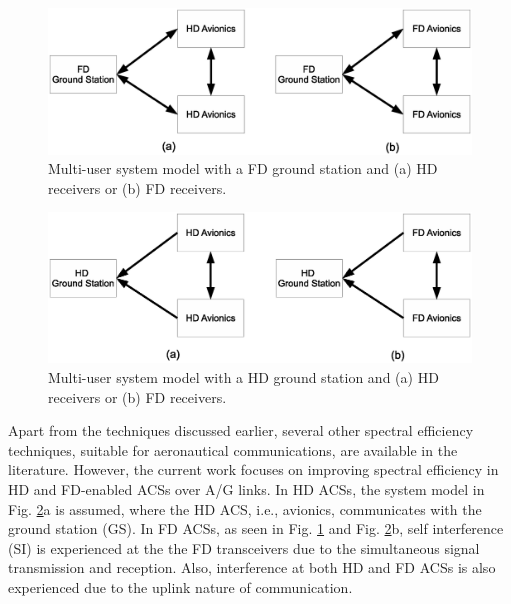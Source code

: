 \begin{figure}[]
\centering
\vspace{-2cm}
\includegraphics [width=0.8\columnwidth]{chap2_fig/chap2_fd_gs_system_model.eps} 
\vspace{-2.2cm}
\caption{Multi-user system model with a FD ground station and (a) HD receivers or (b) FD receivers.}
\label{fig:chap2_fd_gs_system_model}
\end{figure}

\begin{figure}[]
\centering
\vspace{-2cm}
\includegraphics [width=0.8\columnwidth]{chap2_fig/chap2_hd_gs_system_model.eps} 
\vspace{-2cm}
\caption{Multi-user system model with a HD ground station and (a) HD receivers or (b) FD receivers.}
\label{fig:chap2_hd_gs_system_model}
\end{figure}

Apart from the techniques discussed earlier, several other spectral efficiency techniques, suitable for aeronautical communications, are available in the literature. However, the current work focuses on improving spectral efficiency in HD and FD-enabled ACSs over A/G links. In HD ACSs, the system model in Fig. \ref{fig:chap2_hd_gs_system_model}a is assumed, where the HD ACS, i.e., avionics, communicates with the ground station (GS). In FD ACSs, as seen in Fig. \ref{fig:chap2_fd_gs_system_model} and Fig. \ref{fig:chap2_hd_gs_system_model}b, self interference (SI) is experienced at the the FD transceivers due to the simultaneous signal transmission and reception. Also, interference at both HD and FD ACSs is also experienced due to the uplink nature of communication. 

